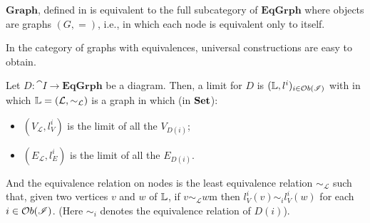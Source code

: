 \begin{obs}
    $\mathbf{Graph}$, defined in  is equivalent to the full subcategory of $\mathbf{EqGrph}$ where objects are graphs $(G, =)$, i.e., in which each node is equivalent only to itself.
\end{obs}


In the category of graphs with equivalences, universal constructions are easy to obtain. 
\begin{prop}\label{prop:limits_in_EqGrph}
    Let $D: \cat I \rightarrow \mathbf{EqGrph}$ be a diagram. Then, a limit for $D$ is $(\mathbb{L}, l^i)_{i\in \mathcal{O}b(\mathscr{I})}$ with in which $\mathbb{L} = (\mathcal{L}, \sim_{\mathcal{L}})$ is a graph in which (in $\mathbf{Set}$):
    \begin{itemize}
        \item $(V_{\mathcal{L}}, l^i_{V})$ is the limit of all the $V_{D(i)}$;
        \item $(E_{\mathcal{L}}, l^i_{E})$ is the limit of all the $E_{D(i)}$.
    \end{itemize}
    And the equivalence relation on nodes is the least equivalence relation $\sim_{\mathcal{L}}$ such that, given two vertices $v$ and $w$ of $\mathbb{L}$, if $v\sim_{\mathcal{L}}w$m then $l^i_V(v) \sim_i l^i_V(w)$ for each $i\in \mathcal{O}b(\mathscr{I})$. (Here $\sim_i$ denotes the equivalence relation of $D(i)$).
\end{prop}

